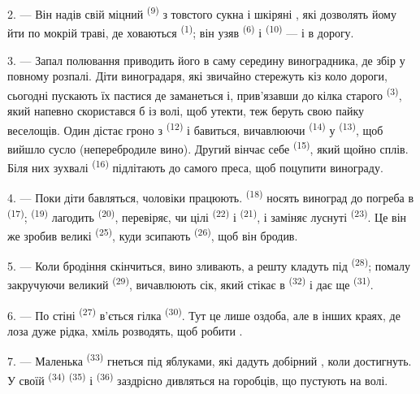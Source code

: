 2. --- Він надів свій міцний  \textsuperscript{(9)} з
товстого сукна і шкіряні , які дозволять йому йти по мокрій
траві, де ховаються  \textsuperscript{(1)}; він узяв
 \textsuperscript{(6)} і 
\textsuperscript{(10)} --- і в дорогу.

3. --- Запал полювання приводить його в саму середину виноградника, де збір у
повному розпалі. Діти виноградаря, які звичайно стережуть кіз коло дороги,
сьогодні пускають їх пастися де заманеться і, прив'язавши до кілка старого
 \textsuperscript{(3)}, який напевно скористався б із волі, щоб
утекти, теж беруть свою пайку веселощів. Один дістає гроно з  \textsuperscript{(12)} і бавиться, вичавлюючи 
\textsuperscript{(14)} у  \textsuperscript{(13)}, щоб вийшло сусло
(неперебродиле вино). Другий вінчає себе 
\textsuperscript{(15)}, який щойно сплів. Біля них зухвалі 
\textsuperscript{(16)} підлітають до самого преса, щоб поцупити винограду.

4. --- Поки діти бавляться, чоловіки працюють. 
\textsuperscript{(18)} носять виноград до погреба в 
\textsuperscript{(17)};  \textsuperscript{(19)} лагодить
 \textsuperscript{(20)}, перевіряє, чи цілі 
\textsuperscript{(22)} і  \textsuperscript{(21)}, і заміняє луснуті
 \textsuperscript{(23)}. Це він же зробив великі 
\textsuperscript{(25)}, куди зсипають  \textsuperscript{(26)},
щоб він бродив.

5. --- Коли бродіння скінчиться, вино зливають, а решту кладуть під
 \textsuperscript{(28)}; помалу закручуючи великий 
\textsuperscript{(29)}, вичавлюють сік, який стікає в 
\textsuperscript{(32)} і дає ще  \textsuperscript{(31)}.

\VUsaut{6.0mm}
\VUsaut{3.4mm}

6. --- По стіні  \textsuperscript{(27)} в'ється гілка
 \textsuperscript{(30)}. Тут це лише оздоба, але в інших краях, де
лоза дуже рідка, хміль розводять, щоб робити .

7. --- Маленька  \textsuperscript{(33)} гнеться під яблуками, які
дадуть добірний , коли достигнуть. У своїй 
\textsuperscript{(34)}  \textsuperscript{(35)} і 
\textsuperscript{(36)} заздрісно дивляться на горобців, що пустують на волі.

